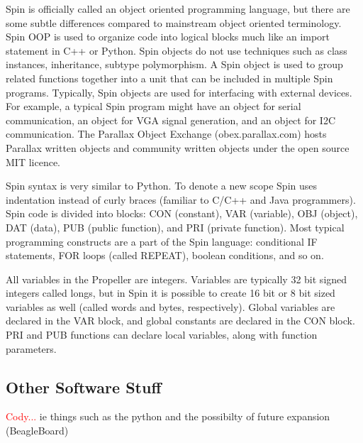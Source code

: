\documentclass{article}
\numberwithin{equation}{section} %
\begin{document}
Spin is officially called an object oriented programming language, but there are some subtle differences compared to mainstream object oriented terminology. Spin OOP is used to organize code into logical blocks much like an import statement in C++ or Python. Spin objects do not use techniques such as class instances, inheritance, subtype polymorphism. A Spin object is used to group related functions together into a unit that can be included in multiple Spin programs. Typically, Spin objects are used for interfacing with external devices. For example, a typical Spin program might have an object for serial communication, an object for VGA signal generation, and an object for I2C communication. The Parallax Object Exchange (obex.parallax.com) hosts Parallax written objects and community written objects under the open source MIT licence.

Spin syntax is very similar to Python. To denote a new scope Spin uses indentation instead of curly braces {} (familiar to C/C++ and Java programmers). Spin code is divided into blocks: CON (constant), VAR (variable), OBJ (object), DAT (data), PUB (public function), and PRI (private function). Most typical programming constructs are a part of the Spin language: conditional IF statements, FOR loops (called REPEAT), boolean conditions, and so on.

All variables in the Propeller are integers. Variables are typically 32 bit signed integers called longs, but in Spin it is possible to create 16 bit or 8 bit sized variables as well (called words and bytes, respectively). Global variables are declared in the VAR block, and global constants are declared in the CON block. PRI and PUB functions can declare local variables, along with function parameters. 


\subsection{Other Software Stuff}
\textcolor{red}{Cody...} ie things such as the python and the possibilty of future expansion (BeagleBoard)



\end{document}
